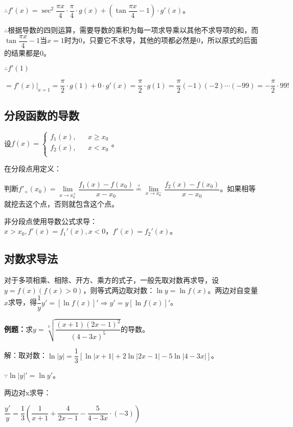 \documentclass[UTF8, 12pt]{ctexart}
\begin{document}
$\therefore f'(x)=\sec^2\dfrac{\pi x}{4}\cdot\dfrac{\pi}{4}\cdot g(x)+\left(\tan\dfrac{\pi x}{4}-1\right)\cdot g'(x)$。\medskip

$\therefore$根据导数的四则运算，需要导数的乘积为每一项求导乘以其他不求导项的和，而$\tan\dfrac{\pi x}{4}-1$当$x=1$时为0，只要它不求导，其他的项都必然是0，所以原式的后面的结果都是0。

$\therefore f'(1)$

$=f'(x)\vert_{x=1}=\dfrac{\pi}{2}\cdot g(1)+0\cdot g'(x)=\dfrac{\pi}{2}\cdot g(1)=\dfrac{\pi}{2}(-1)(-2)\cdots(-99)=-\dfrac{\pi}{2}\cdot 99!$

\subsection{分段函数的导数}

设$f(x)=\left\{
    \begin{array}{lcl}
        f_1(x), & & x\geqslant x_0 \\
        f_2(x), & & x<x_0 \\
    \end{array}
\right.$。\medskip

在分段点用定义：

判断$f'_+(x_0)=\lim\limits_{x\to x_0^+}\dfrac{f_1(x)-f(x_0)}{x-x_0}\overset{?}{=}\lim\limits_{x\to x_0^-}\dfrac{f_2(x)-f(x_0)}{x-x_0}$。如果相等就挖去这个点，否则就包含这个点。

非分段点使用导数公式求导：$x>x_0,f'(x)=f_1'(x),x<0，f'(x)=f_2'(x)$。

\subsection{对数求导法}

对于多项相乘、相除、开方、乘方的式子，一般先取对数再求导，设$y=f(x)(f(x)>0)$，则等式两边取对数：$\ln y=\ln f(x)$。两边对自变量$x$求导，得$\dfrac{1}{y}y'=[\ln f(x)]'\Rightarrow y'=y[\ln f(x)]'$。

\textbf{例题：}求$y=\sqrt[3]{\dfrac{(x+1)(2x-1)^2}{(4-3x)^5}}$的导数。

解：取对数：$\ln\vert y\vert=\dfrac{1}{3}[\ln\vert x+1\vert+2\ln\vert 2x-1\vert-5\ln\vert 4-3x\vert]$。

$\because \ln\vert y\vert'=\ln y'$。

两边对x求导：\medskip

$\dfrac{y'}{y}=\dfrac{1}{3}\left(\dfrac{1}{x+1}+\dfrac{4}{2x-1}-\dfrac{5}{4-3x}\cdot(-3)\right)$
\end{document}
